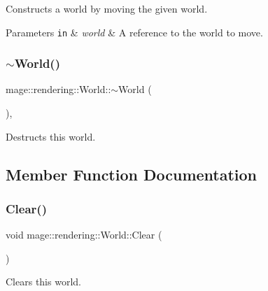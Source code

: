 Constructs a world by moving the given world.


\begin{DoxyParams}[1]{Parameters}
\mbox{\tt in}  & {\em world} & A reference to the world to move. \\
\hline
\end{DoxyParams}
\hypertarget{classmage_1_1rendering_1_1_world_a97d321ddb178e24758bb40d74968ac51}{}\label{classmage_1_1rendering_1_1_world_a97d321ddb178e24758bb40d74968ac51} 
\subsubsection{\texorpdfstring{$\sim$\+World()}{~World()}}
{\footnotesize\ttfamily mage\+::rendering\+::\+World\+::$\sim$\+World (\begin{DoxyParamCaption}{ }\end{DoxyParamCaption})\hspace{0.3cm}{\ttfamily [virtual]}, {\ttfamily [default]}}

Destructs this world. 

\subsection{Member Function Documentation}
\hypertarget{classmage_1_1rendering_1_1_world_ac04420d32e7cb0a28c33d7d451ca05cc}{}\label{classmage_1_1rendering_1_1_world_ac04420d32e7cb0a28c33d7d451ca05cc} 
\subsubsection{\texorpdfstring{Clear()}{Clear()}}
{\footnotesize\ttfamily void mage\+::rendering\+::\+World\+::\+Clear (\begin{DoxyParamCaption}{ }\end{DoxyParamCaption})\hspace{0.3cm}{\ttfamily [noexcept]}}

Clears this world. \hypertarget{classmage_1_1rendering_1_1_world_a2b653a260b5a74f579efb1416f0e2c7d}{}\label{classmage_1_1rendering_1_1_world_a2b653a260b5a74f579efb1416f0e2c7d} 
